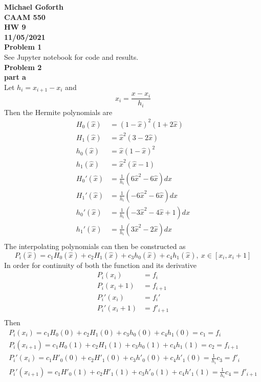 \documentclass{article} %
\begin{document}
\textbf{Michael Goforth} \\
\textbf{CAAM 550} \\
\textbf{HW 9} \\
\textbf{11/05/2021} \\ 

\textbf{Problem 1} \\
See Jupyter notebook for code and results.
\\


\textbf{Problem 2} \\

\textbf{part a} \\
Let $h_i = x_{i+1} - x_i$ and
\begin{equation*}
\hat{x_i} = \frac{x - x_i}{h_i}
\end{equation*}
Then the Hermite polynomials are
\begin{align*}
H_0(\hat{x}) &= (1 - \hat{x})^2(1+2\hat{x}) \\
H_1(\hat{x}) &= \hat{x}^2(3-2\hat{x}) \\
h_0(\hat{x}) &= \hat{x}(1-\hat{x})^2 \\
h_1(\hat{x}) &= \hat{x}^2(\hat{x}-1) \\
H_0'(\hat{x}) &= \frac{1}{h_i}(6\hat{x}^2 - 6\hat{x})dx \\
H_1'(\hat{x}) &= \frac{1}{h_i}(-6\hat{x}^2 - 6\hat{x})dx \\
h_0'(\hat{x}) &= \frac{1}{h_i}(-3\hat{x}^2 - 4\hat{x} + 1)dx \\
h_1'(\hat{x}) &= \frac{1}{h_i}(3\hat{x}^2 - 2\hat{x})dx \\
\end{align*}
The interpolating polynomials can then be constructed as
\begin{equation*}
P_i(\hat{x}) = c_1 H_0(\hat{x}) + c_2 H_1(\hat{x}) + c_3 h_0 (\hat{x}) + c_4 h_1 (\hat{x}),\ x \in [x_i, x_i+1]
\end{equation*}
In order for continuity of both the function and its derivative 
\begin{align*}
P_i(x_i) &= f_i \\
P_i(x_i+1) &= f_{i+1} \\
P_i'(x_i) &= f_i' \\
P_i'(x_i+1) &= f'_{i+1} \\ 
\end{align*}
Then 
\begin{align*}
P_i(x_i) = c_1 H_0(0) + c_2 H_1 (0) + c_3 h_0(0) + c_4 h_1(0) = c_1 = f_i \\
P_i(x_{i+1}) = c_1 H_0(1) + c_2 H_1 (1) + c_3 h_0(1) + c_4 h_1(1) = c_2 = f_{i+1} \\
P_i'(x_i) = c_1 H'_0(0) + c_2 H'_1 (0) + c_3 h'_0(0) + c_4 h'_1(0) = \frac{1}{h_i} c_3 = f'_i \\
P_i'(x_{i+1}) = c_1 H'_0(1) + c_2 H'_1 (1) + c_3 h'_0(1) + c_4 h'_1(1) = \frac{1}{h_i} c_4 = f'_{i+1} \\
\end{align*}
\end{document}
